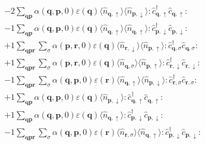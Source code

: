 \begin{align*}
	&-2 \sum_{ \mathbf{q} \mathbf{p} } \alpha( \mathbf{q}, \mathbf{p}, 0 )  \varepsilon( \mathbf{q} )   \langle \hat{n}_{ \mathbf{q}, \uparrow } \rangle \langle \hat{n}_{ \mathbf{p}, \downarrow } \rangle :\hat{c}_{ \mathbf{q}, \uparrow }^\dagger \hat{c}_{ \mathbf{q}, \uparrow }^{\phantom{\dagger}}: \\
	&-1 \sum_{ \mathbf{q} \mathbf{p} } \alpha( \mathbf{q}, \mathbf{p}, 0 )  \varepsilon( \mathbf{q} )   \langle \hat{n}_{ \mathbf{q}, \uparrow } \rangle \langle \hat{n}_{ \mathbf{q}, \uparrow } \rangle :\hat{c}_{ \mathbf{p}, \downarrow }^\dagger \hat{c}_{ \mathbf{p}, \downarrow }^{\phantom{\dagger}}: \\
	&+1 \sum_{ \mathbf{q} \mathbf{p} \mathbf{r} } \sum_{ \sigma } \alpha( \mathbf{p}, \mathbf{r}, 0 )  \varepsilon( \mathbf{q} )   \langle \hat{n}_{ \mathbf{r}, \downarrow } \rangle \langle \hat{n}_{ \mathbf{p}, \uparrow } \rangle :\hat{c}_{ \mathbf{q}, \sigma }^\dagger \hat{c}_{ \mathbf{q}, \sigma }^{\phantom{\dagger}}: \\
	&+1 \sum_{ \mathbf{q} \mathbf{p} \mathbf{r} } \sum_{ \sigma } \alpha( \mathbf{p}, \mathbf{r}, 0 )  \varepsilon( \mathbf{q} )   \langle \hat{n}_{ \mathbf{q}, \sigma } \rangle \langle \hat{n}_{ \mathbf{p}, \uparrow } \rangle :\hat{c}_{ \mathbf{r}, \downarrow }^\dagger \hat{c}_{ \mathbf{r}, \downarrow }^{\phantom{\dagger}}: \\
	&-1 \sum_{ \mathbf{q} \mathbf{p} \mathbf{r} } \sum_{ \sigma } \alpha( \mathbf{q}, \mathbf{p}, 0 )  \varepsilon( \mathbf{r} )   \langle \hat{n}_{ \mathbf{q}, \uparrow } \rangle \langle \hat{n}_{ \mathbf{p}, \downarrow } \rangle :\hat{c}_{ \mathbf{r}, \sigma }^\dagger \hat{c}_{ \mathbf{r}, \sigma }^{\phantom{\dagger}}: \\
	&+1 \sum_{ \mathbf{q} \mathbf{p} } \alpha( \mathbf{q}, \mathbf{p}, 0 )  \varepsilon( \mathbf{q} )   \langle \hat{n}_{ \mathbf{p}, \downarrow } \rangle :\hat{c}_{ \mathbf{q}, \uparrow }^\dagger \hat{c}_{ \mathbf{q}, \uparrow }^{\phantom{\dagger}}: \\
	&+1 \sum_{ \mathbf{q} \mathbf{p} } \alpha( \mathbf{q}, \mathbf{p}, 0 )  \varepsilon( \mathbf{q} )   \langle \hat{n}_{ \mathbf{q}, \uparrow } \rangle :\hat{c}_{ \mathbf{p}, \downarrow }^\dagger \hat{c}_{ \mathbf{p}, \downarrow }^{\phantom{\dagger}}: \\
	&-1 \sum_{ \mathbf{q} \mathbf{p} \mathbf{r} } \sum_{ \sigma } \alpha( \mathbf{q}, \mathbf{p}, 0 )  \varepsilon( \mathbf{r} )   \langle \hat{n}_{ \mathbf{r}, \sigma } \rangle \langle \hat{n}_{ \mathbf{q}, \uparrow } \rangle :\hat{c}_{ \mathbf{p}, \downarrow }^\dagger \hat{c}_{ \mathbf{p}, \downarrow }^{\phantom{\dagger}}: \\

\end{align*}

